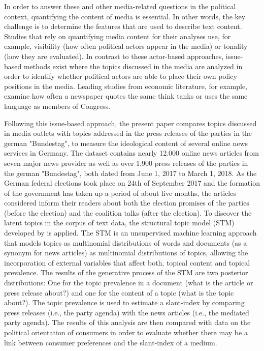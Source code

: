 \documentclass[12pt,a4paper,notitlepage]{article}
\begin{document}
In order to answer these and other media-related questions in the political context, quantifying the content of media is essential. In other words, the key challenge is to determine the features that are used to describe text content. Studies that rely on quantifying media content for their analyses use, for example, visibility (how often political actors appear in the media) or tonality (how they are evaluated). In contrast to these actor-based approaches, issue-based methods exist where the topics discussed in the media are analyzed in order to identify whether political actors are able to place their own policy positions in the media. Leading studies from economic literature, for example, examine how often a newspaper quotes the same think tanks \citep{groseclose_measure_2005, lott_is_2014} or uses the same language \citep{gentzkow_media_2004} as members of Congress. 

Following this issue-based approach, the present paper compares topics discussed in media outlets with topics addressed in the press releases of the parties in the german "Bundestag", to measure the ideological content of several online news services in Germany. The dataset contains nearly 12.000 online news articles from seven major news provider as well as over 1.900 press releases of the parties in the german "Bundestag", both dated from June 1, 2017 to March 1, 2018. As the German federal elections took place on 24th of September 2017 and the formation of the government has taken up a period of about five months, the articles considered inform their readers about both the election promises of the parties (before the election) and the coalition talks (after the election). To discover the latent topics in the corpus of text data, the structural topic model (STM) developed by \citet{roberts_model_2016} is applied. The STM is an unsupervised machine learning approach that models topics as multinomial distributions of words and documents (as a synonym for news articles) as multinomial distributions of topics, allowing the incorporation of external variables that affect both, topical content and topical prevalence. The results of the generative process of the STM are two posterior distributions: One for the topic prevalence in a document (what is the article or press release about?) and one for the content of a topic (what is the topic about?). The topic prevalence is used to estimate a slant-index by comparing press releases (i.e., the party agenda) with the news articles (i.e., the mediated party agenda). The results of this analysis are then compared with data on the political orientation of consumers in order to evaluate whether there may be a link between consumer preferences and the slant-index of a medium. 
\end{document}
